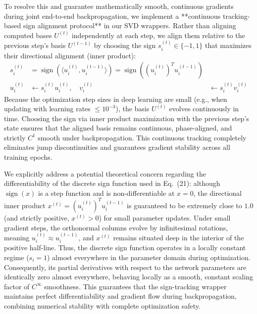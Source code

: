 To resolve this and guarantee mathematically smooth, continuous gradients during joint end-to-end backpropagation, we implement a **continuous tracking-based sign alignment protocol** in our SVD wrappers. Rather than aligning computed bases $U^{(t)}$ independently at each step, we align them relative to the previous step's basis $U^{(t-1)}$ by choosing the sign $s_i^{(t)} \in \{-1, 1\}$ that maximizes their directional alignment (inner product):
\begin{align}
    s_i^{(t)} &= \operatorname{sign}\left( \langle u_i^{(t)}, u_i^{(t-1)} \rangle \right) = \operatorname{sign}\left( (u_i^{(t)})^T u_i^{(t-1)} \right) \\
    u_i^{(t)} &\leftarrow s_i^{(t)} u_i^{(t)}, \quad v_i^{(t)} &\leftarrow s_i^{(t)} v_i^{(t)}
\end{align}
Because the optimization step sizes in deep learning are small (e.g., when updating with learning rates $\le 10^{-3}$), the basis $U^{(t)}$ evolves continuously in time. Choosing the sign via inner product maximization with the previous step's state ensures that the aligned basis remains continuous, phase-aligned, and strictly $C^1$ smooth under backpropagation. This continuous tracking completely eliminates jump discontinuities and guarantees gradient stability across all training epochs.

We explicitly address a potential theoretical concern regarding the differentiability of the discrete sign function used in Eq.~(21): although $\operatorname{sign}(x)$ is a step function and is non-differentiable at $x=0$, the directional inner product $x^{(t)} = (u_i^{(t)})^T u_i^{(t-1)}$ is guaranteed to be extremely close to $1.0$ (and strictly positive, $x^{(t)} > 0$) for small parameter updates. Under small gradient steps, the orthonormal columns evolve by infinitesimal rotations, meaning $u_i^{(t)} \approx u_i^{(t-1)}$, and $x^{(t)}$ remains situated deep in the interior of the positive half-line. Thus, the discrete sign function operates in a locally constant regime ($s_i = 1$) almost everywhere in the parameter domain during optimization. Consequently, its partial derivatives with respect to the network parameters are identically zero almost everywhere, behaving locally as a smooth, constant scaling factor of $C^\infty$ smoothness. This guarantees that the sign-tracking wrapper maintains perfect differentiability and gradient flow during backpropagation, combining numerical stability with complete optimization safety.

